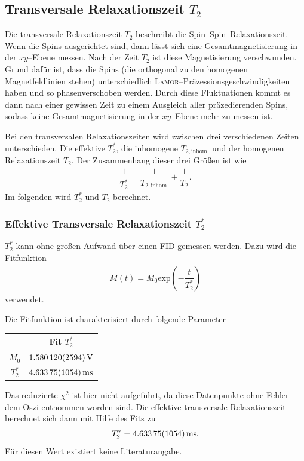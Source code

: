\documentclass[10pt]{article}
\newenvironment{Figure}
  {\par\medskip\noindent\minipage{\linewidth}}
  {\endminipage\par\medskip}
\begin{document}
\begin{multicols}{2}
\subsection{Transversale Relaxationszeit $T_2$}
Die transversale Relaxationszeit $T_2$ beschreibt die Spin--Spin--Relaxationszeit.
Wenn die Spins ausgerichtet sind, dann lässt sich eine Gesamtmagnetisierung in der $xy$--Ebene messen.
Nach der Zeit $T_2$ ist diese Magnetisierung verschwunden.
Grund dafür ist, dass die Spins (die orthogonal zu den homogenen Magnetfeldlinien stehen) unterschiedlich \textsc{Lamor}--Präzessionsgeschwindigkeiten haben und so phasenverschoben werden.
Durch diese Fluktuationen kommt es dann nach einer gewissen Zeit zu einem Ausgleich aller präzedierenden Spins, sodass keine Gesamtmagnetisierung in der $xy$--Ebene mehr zu messen ist.

Bei den transversalen Relaxationszeiten wird zwischen drei verschiedenen Zeiten unterschieden.
Die effektive $T_2^*$, die inhomogene $T_{2,\text{inhom.}}$ und der homogenen Relaxationszeit $T_2$.
Der Zusammenhang dieser drei Größen ist wie
\begin{align} 
        \dfrac{1}{T_2^*}=\dfrac{1}{T_{2,\text{inhom.}}}+\dfrac{1}{T_2}
.\end{align} 
Im folgenden wird $T_2^*$ und $T_2$ berechnet.

\subsubsection{Effektive Transversale Relaxationszeit $T_2^*$}
$T_2^*$ kann ohne großen Aufwand über einen FID gemessen werden.
Dazu wird die Fitfunktion
\begin{align} 
        M\left(t\right)=M_0\text{exp}\left(-\dfrac{t}{T_2^*}\right)
\end{align} 
verwendet.
  \begin{Figure}
    \centering\resizebox{\textwidth}{!}{}
    \label{fig:T2eff}
  \end{Figure}
Die Fitfunktion ist charakterisiert durch folgende Parameter
  \begin{center}
    \begin{tabular}{c|c}
    & Fit $T_2^*$\\
    \hline
    $M_0$ & $\SI{1.58012+-0.002594}{V}$ \\
    $T_2^*$ & $\SI{4.63375+-0.01054}{ms}$ 
    \end{tabular}
  \label{Tab:PZG_para}
  \end{center}
Das reduzierte $\chi ^2$ ist hier nicht aufgeführt, da diese Datenpunkte ohne Fehler dem Oszi entnommen worden sind.
Die effektive transversale Relaxationszeit berechnet sich dann mit Hilfe des Fits zu
\begin{align} 
        T_2^*=\SI{4.63375+-0.01054}{ms}
.\end{align} 
Für diesen Wert existiert keine Literaturangabe.


\end{multicols}
\end{document}
